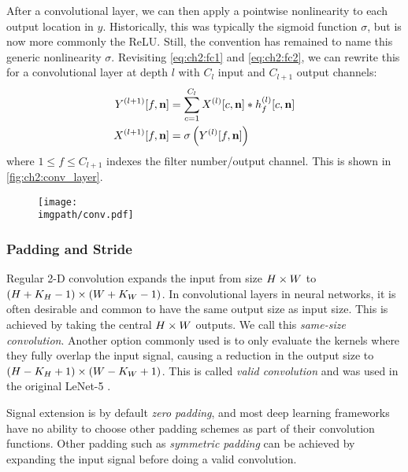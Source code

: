 After a convolutional layer, we can then apply a pointwise nonlinearity to
each output location in $y$. Historically, this was typically the sigmoid function $\sigma$, but 
is now more commonly the ReLU. Still, the convention has remained to name this
generic nonlinearity $\sigma$. Revisiting \eqref{eq:ch2:fc1} and
\eqref{eq:ch2:fc2}, we can rewrite this for a convolutional layer at depth $l$
with $C_l$ input and $C_{l+1}$ output channels:
\begin{align}
  Y^{(l+1)}[f, \mathbf{n}] &= \sum_{c=1}^{C_l} X^{(l)}[c, \mathbf{n}] \ast h^{(l)}_f[c, \mathbf{n}] 
    \label{eq:ch2:conv4}\\
    X^{(l+1)}[f, \mathbf{n}] &= \sigma\left(Y^{(l)}[f, \mathbf{n}]\right) \label{eq:ch2:conv4a}
\end{align}
where $ 1 \leq f \leq C_{l+1}$ indexes the filter number/output channel. This is shown in \autoref{fig:ch2:conv_layer}.

\begin{figure}
  \centering
  \texttt{[image: \\imgpath/conv.pdf]}
  \label{fig:ch2:conv_layer}
\end{figure}

\subsubsection{Padding and Stride}
Regular 2-D convolution expands the input from size $H\times W$ to $(H+K_H-1)\times
(W+K_W-1)$. In convolutional layers in neural networks, it is often desirable
and common to have the same output size as input size. This is achieved by
taking the central $H\times W$ outputs. We call this \emph{same-size convolution}.
Another option commonly used is to only evaluate the kernels where they fully
overlap the input signal, causing a reduction in the output size to $(H-K_H+1)
\times (W-K_W+1)$. This is called \emph{valid convolution} and was used in the
original LeNet-5 \cite{lecun_gradient-based_1998}.

Signal extension is by default \emph{zero padding}, and most deep learning
frameworks have no ability to choose other padding schemes as part of their
convolution functions. Other padding such as \emph{symmetric padding} can be
achieved by expanding the input signal before doing a valid convolution.

